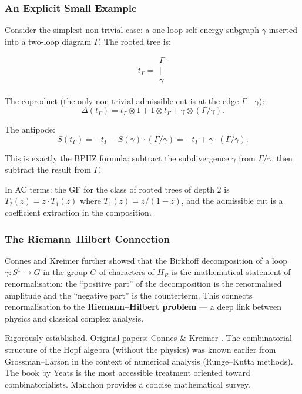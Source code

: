 \documentclass[11pt,a4paper]{article}
\theoremstyle{definition}
\begin{document}
\subsubsection{An Explicit Small Example}

Consider the simplest non-trivial case: a one-loop self-energy subgraph $\gamma$
inserted into a two-loop diagram $\Gamma$. The rooted tree is:

\[
  t_\Gamma = \begin{array}{c}
    \Gamma \\
    | \\
    \gamma
  \end{array}
\]

The coproduct (the only non-trivial admissible cut is at the edge $\Gamma\text{---}\gamma$):
\[
  \Delta(t_\Gamma) = t_\Gamma \otimes 1 + 1 \otimes t_\Gamma + \gamma \otimes (\Gamma/\gamma).
\]

The antipode:
\[
  S(t_\Gamma) = -t_\Gamma - S(\gamma)\cdot(\Gamma/\gamma) = -t_\Gamma + \gamma\cdot(\Gamma/\gamma).
\]

This is exactly the BPHZ formula: subtract the subdivergence $\gamma$ from
$\Gamma/\gamma$, then subtract the result from $\Gamma$.

In AC terms: the GF for the class of rooted trees of depth 2 is
$T_2(z) = z \cdot T_1(z)$ where $T_1(z) = z/(1-z)$, and the admissible
cut is a coefficient extraction in the composition.

\subsubsection{The Riemann--Hilbert Connection}

Connes and Kreimer further showed \cite{conneskreimer2000} that the
Birkhoff decomposition of a loop $\gamma: S^1 \to G$ in the group $G$
of characters of $H_R$ is the mathematical statement of renormalisation:
the ``positive part'' of the decomposition is the renormalised amplitude
and the ``negative part'' is the counterterm. This connects renormalisation
to the \textbf{Riemann--Hilbert problem} --- a deep link between physics
and classical complex analysis.

\begin{resultbox}[Status]
Rigorously established. Original papers: Connes \& Kreimer
\cite{conneskreimer1998, conneskreimer2000}. The combinatorial structure
of the Hopf algebra (without the physics) was known earlier from
Grossman--Larson \cite{grossmanlarson1989} in the context of numerical analysis (Runge--Kutta
methods). The book by Yeats \cite{yeats2017} is the most accessible
treatment oriented toward combinatorialists. Manchon \cite{manchon2004}
provides a concise mathematical survey.
\end{resultbox}
\end{document}
